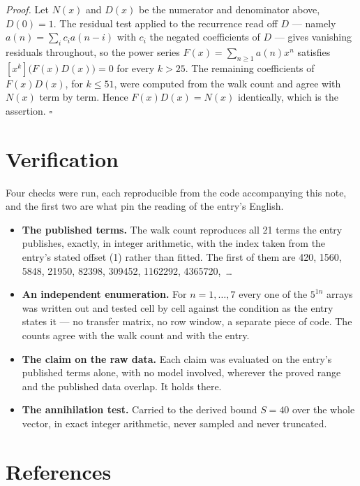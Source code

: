 \documentclass[11pt]{article}
\theoremstyle{definition}
\begin{document}
{\itshape Proof.} Let $N(x)$ and $D(x)$ be the numerator and denominator above, $D(0)=1$. The residual test applied to the recurrence read off $D$ --- namely $a(n) = \sum_i c_i a(n-i)$ with $c_i$ the negated coefficients of $D$ --- gives vanishing residuals throughout, so the power series $F(x)=\sum_{n\ge 1}a(n)x^n$ satisfies $[x^k]\bigl(F(x)D(x)\bigr) = 0$ for every $k > 25$. The remaining coefficients of $F(x)D(x)$, for $k \le 51$, were computed from the walk count and agree with $N(x)$ term by term. Hence $F(x)D(x) = N(x)$ identically, which is the assertion. $\square$

\section{Verification}

Four checks were run, each reproducible from the code accompanying this note, and the first two are what pin the reading of the entry's English.

\begin{itemize}

\item {\bfseries The published terms.} The walk count reproduces all 21 terms the entry publishes, exactly, in integer arithmetic, with the index taken from the entry's stated offset (1) rather than fitted. The first of them are 420, 1560, 5848, 21950, 82398, 309452, 1162292, 4365720,~\dots

\item {\bfseries An independent enumeration.} For $n = 1,\dots,7$ every one of the $5^{1n}$ arrays was written out and tested cell by cell against the condition as the entry states it --- no transfer matrix, no row window, a separate piece of code. The counts agree with the walk count and with the entry.

\item {\bfseries The claim on the raw data.} Each claim was evaluated on the entry's published terms alone, with no model involved, wherever the proved range and the published data overlap. It holds there.

\item {\bfseries The annihilation test.} Carried to the derived bound $S = 40$ over the whole vector, in exact integer arithmetic, never sampled and never truncated.

\end{itemize}

\section{References}
\end{document}
